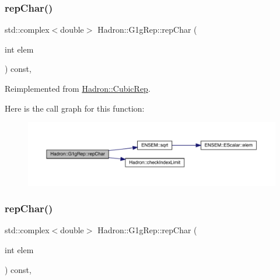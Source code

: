 \subsubsection{\texorpdfstring{repChar()}{repChar()}\hspace{0.1cm}{\footnotesize\ttfamily [2/3]}}
{\footnotesize\ttfamily std\+::complex$<$double$>$ Hadron\+::\+G1g\+Rep\+::rep\+Char (\begin{DoxyParamCaption}\item[{int}]{elem }\end{DoxyParamCaption}) const\hspace{0.3cm}{\ttfamily [inline]}, {\ttfamily [virtual]}}



Reimplemented from \mbox{\hyperlink{structHadron_1_1CubicRep_af45227106e8e715e84b0af69cd3b36f8}{Hadron\+::\+Cubic\+Rep}}.

Here is the call graph for this function\+:
\nopagebreak
\begin{figure}[H]
\begin{center}
\leavevmode
\includegraphics[width=350pt]{d4/d3c/structHadron_1_1G1gRep_aaf106033a828159337aed03c6489087f_cgraph}
\end{center}
\end{figure}
\mbox{\label{structHadron_1_1G1gRep_aaf106033a828159337aed03c6489087f}} 
\subsubsection{\texorpdfstring{repChar()}{repChar()}\hspace{0.1cm}{\footnotesize\ttfamily [3/3]}}
{\footnotesize\ttfamily std\+::complex$<$double$>$ Hadron\+::\+G1g\+Rep\+::rep\+Char (\begin{DoxyParamCaption}\item[{int}]{elem }\end{DoxyParamCaption}) const\hspace{0.3cm}{\ttfamily [inline]}, {\ttfamily [virtual]}}



